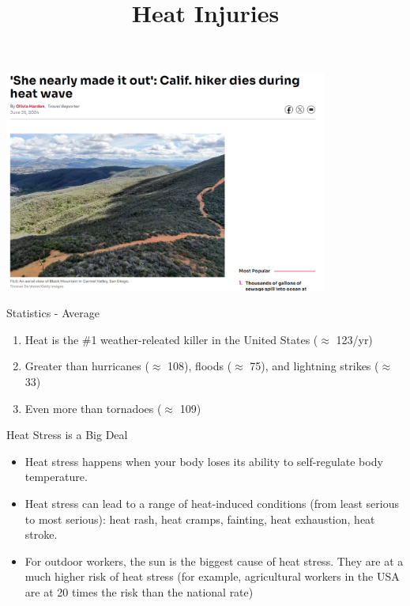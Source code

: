 \documentclass[aspectratio=169,notes]{beamer}
\title{Heat Injuries}
\institute{Engineers for Exploration, UC San Diego}
\begin{document}
\maketitle
\begin{frame}
    \centering
    \includegraphics[width=0.8\textwidth, height=0.8\textheight, keepaspectratio]{2024-06-25-sfgate-california-hiker-dies-heat-wave.png}
\end{frame}
\begin{frame}{Statistics - Average}
    \begin{enumerate}
        \item Heat is the \#1 weather-releated killer in the United States ($\approx$ 123/yr)
        \item Greater than hurricanes ($\approx$ 108), floods ($\approx$ 75), and lightning strikes ($\approx$ 33)
        \item Even more than tornadoes ($\approx$ 109)
    \end{enumerate}
\end{frame}
\begin{frame}{Heat Stress is a Big Deal}
    \begin{itemize}
        \item Heat stress happens when your body loses its ability to self-regulate body temperature.
        \item Heat stress can lead to a range of heat-induced conditions (from least serious to most serious): heat rash, heat cramps, fainting, heat exhaustion, heat stroke.
        \item For outdoor workers, the sun is the biggest cause of heat stress. They are at a much higher risk of heat stress (for example, agricultural workers in the USA are at 20 times the risk than the national rate) 
    \end{itemize}
\end{frame}
\end{document}
